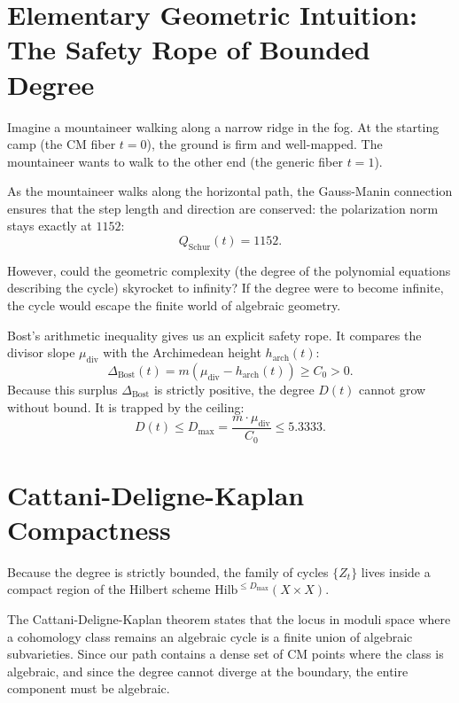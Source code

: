 \documentclass[11pt,a4paper]{article}
\theoremstyle{definition}
\begin{document}
\section{Elementary Geometric Intuition: The Safety Rope of Bounded Degree}

Imagine a mountaineer walking along a narrow ridge in the fog. At the starting camp (the CM fiber $t = 0$), the ground is firm and well-mapped. The mountaineer wants to walk to the other end (the generic fiber $t = 1$).

As the mountaineer walks along the horizontal path, the Gauss-Manin connection ensures that the step length and direction are conserved: the polarization norm stays exactly at $1152$:
\begin{equation}
Q_{\text{Schur}}(t) = 1152.
\end{equation}

However, could the geometric complexity (the degree of the polynomial equations describing the cycle) skyrocket to infinity? If the degree were to become infinite, the cycle would escape the finite world of algebraic geometry.

Bost's arithmetic inequality gives us an explicit safety rope. It compares the divisor slope $\mu_{\text{div}}$ with the Archimedean height $h_{\text{arch}}(t)$:
\begin{equation}
\Delta_{\text{Bost}}(t) = m (\mu_{\text{div}} - h_{\text{arch}}(t)) \ge C_0 > 0.
\end{equation}
Because this surplus $\Delta_{\text{Bost}}$ is strictly positive, the degree $D(t)$ cannot grow without bound. It is trapped by the ceiling:
\begin{equation}
D(t) \le D_{\max} = \frac{m \cdot \mu_{\text{div}}}{C_0} \le 5.3333.
\end{equation}

\section{Cattani-Deligne-Kaplan Compactness}

Because the degree is strictly bounded, the family of cycles $\{Z_t\}$ lives inside a compact region of the Hilbert scheme $\text{Hilb}^{\le D_{\max}}(X \times X)$.

The Cattani-Deligne-Kaplan theorem states that the locus in moduli space where a cohomology class remains an algebraic cycle is a finite union of algebraic subvarieties. Since our path contains a dense set of CM points where the class is algebraic, and since the degree cannot diverge at the boundary, the entire component must be algebraic.
\end{document}
